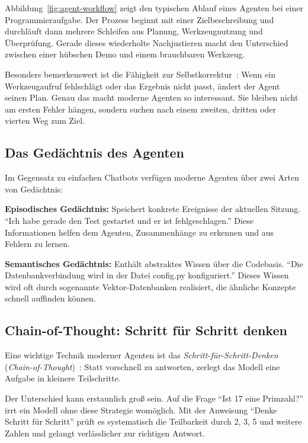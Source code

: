 Abbildung~\ref{fig:agent-workflow} zeigt den typischen Ablauf eines Agenten bei einer Programmieraufgabe. Der Prozess beginnt mit einer Zielbeschreibung und durchläuft dann mehrere Schleifen aus Planung, Werkzeugnutzung und Überprüfung. Gerade dieses wiederholte Nachjustieren macht den Unterschied zwischen einer hübschen Demo und einem brauchbaren Werkzeug.

Besonders bemerkenswert ist die Fähigkeit zur Selbstkorrektur~\cite{shinn2023reflexion}: Wenn ein Werkzeugaufruf fehlschlägt oder das Ergebnis nicht passt, ändert der Agent seinen Plan. Genau das macht moderne Agenten so interessant. Sie bleiben nicht am ersten Fehler hängen, sondern suchen nach einem zweiten, dritten oder vierten Weg zum Ziel.

\subsection{Das Gedächtnis des Agenten}

Im Gegensatz zu einfachen Chatbots verfügen moderne Agenten über zwei Arten von Gedächtnis:

\textbf{Episodisches Gedächtnis:} Speichert konkrete Ereignisse der aktuellen Sitzung. \enquote{Ich habe gerade den Test gestartet und er ist fehlgeschlagen.} Diese Informationen helfen dem Agenten, Zusammenhänge zu erkennen und aus Fehlern zu lernen.

\textbf{Semantisches Gedächtnis:} Enthält abstraktes Wissen über die Codebasis. \enquote{Die Datenbankverbindung wird in der Datei config.py konfiguriert.} Dieses Wissen wird oft durch sogenannte Vektor-Datenbanken realisiert, die ähnliche Konzepte schnell auffinden können.

\subsection{Chain-of-Thought: Schritt für Schritt denken}

Eine wichtige Technik moderner Agenten ist das \emph{Schritt-für-Schritt-Denken} (\emph{Chain-of-Thought})~\cite{wei2022chain}: Statt vorschnell zu antworten, zerlegt das Modell eine Aufgabe in kleinere Teilschritte.

Der Unterschied kann erstaunlich groß sein. Auf die Frage \enquote{Ist 17 eine Primzahl?} irrt ein Modell ohne diese Strategie womöglich. Mit der Anweisung \enquote{Denke Schritt für Schritt} prüft es systematisch die Teilbarkeit durch 2, 3, 5 und weitere Zahlen und gelangt verlässlicher zur richtigen Antwort.


